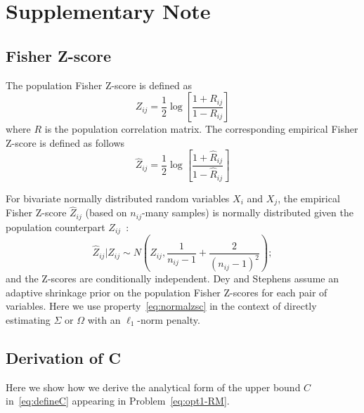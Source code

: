 \clearpage
{}
\setcounter{page}{1}
\newpage

\section*{Supplementary Note}

\subsection*{Fisher Z-score}
The population Fisher Z-score\cite{fisher1915} is defined as 
\begin{equation}\label{eq:popzsc}
Z_{ij} = \frac{1}{2} \log \left [  \frac{1 + R_{ij}}{1 - R_{ij}}  \right ]
\end{equation}
where $R$ is the population correlation matrix. The corresponding empirical Fisher Z-score is defined as follows 
\begin{equation}\label{eq:empzsc}
\hat{Z}_{ij} = \frac{1}{2} \log \left [  \frac{1 + \hat{R}_{ij}}{1 - \hat{R}_{ij}}  \right ]
\end{equation}

For bivariate normally distributed random variables $X_i$ and $X_j$, the empirical Fisher Z-score $\hat{Z}_{ij}$ (based on $n_{ij}$-many samples) 
is normally distributed given the population counterpart $Z_{ij}$~\cite{fisher1921}:
\begin{equation}\label{eq:normalzsc}
\hat{Z}_{ij} | Z_{ij} \sim N \left  (   Z_{ij}, \frac{1}{n_{ij} - 1} + \frac{2}{(n_{ij} - 1)^2}  \right );
\end{equation}
and the Z-scores are conditionally independent. 
Dey and Stephens \citep{dey2019} assume an adaptive shrinkage prior on the population Fisher Z-scores for each pair of variables. Here we use property~\eqref{eq:normalzsc} in the context of directly estimating $\Sigma$ or $\Omega$ with an $\ell_{1}$-norm penalty. 

\subsection*{Derivation of C}

Here we show how we derive the analytical form of the upper bound $C$ in~\eqref{eq:defineC} appearing in Problem~\eqref{eq:opt1-RM}. 

